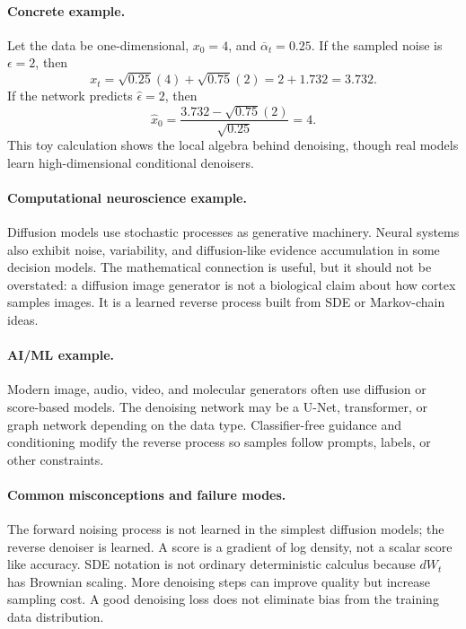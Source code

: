 \paragraph{Concrete example.}
Let the data be one-dimensional, \(x_0=4\), and \(\overline\alpha_t=0.25\). If the sampled noise is \(\epsilon=2\), then
\[
x_t=\sqrt{0.25}(4)+\sqrt{0.75}(2)
=2+1.732=3.732.
\]
If the network predicts \(\widehat\epsilon=2\), then
\[
\widehat x_0
=\frac{3.732-\sqrt{0.75}(2)}{\sqrt{0.25}}
=4.
\]
This toy calculation shows the local algebra behind denoising, though real models learn high-dimensional conditional denoisers.

\paragraph{Computational neuroscience example.}
Diffusion models use stochastic processes as generative machinery. Neural systems also exhibit noise, variability, and diffusion-like evidence accumulation in some decision models. The mathematical connection is useful, but it should not be overstated: a diffusion image generator is not a biological claim about how cortex samples images. It is a learned reverse process built from SDE or Markov-chain ideas.

\paragraph{AI/ML example.}
Modern image, audio, video, and molecular generators often use diffusion or score-based models. The denoising network may be a U-Net, transformer, or graph network depending on the data type. Classifier-free guidance and conditioning modify the reverse process so samples follow prompts, labels, or other constraints.

\paragraph{Common misconceptions and failure modes.}
The forward noising process is not learned in the simplest diffusion models; the reverse denoiser is learned. A score is a gradient of log density, not a scalar score like accuracy. SDE notation is not ordinary deterministic calculus because \(dW_t\) has Brownian scaling. More denoising steps can improve quality but increase sampling cost. A good denoising loss does not eliminate bias from the training data distribution.

